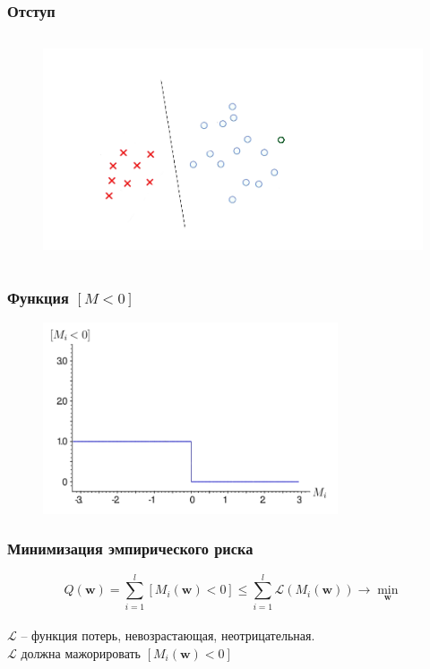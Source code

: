 \documentclass[10pt]{beamer}
\begin{document}
\begin{frame}\frametitle{Отступ}
	\begin{figure}[htbp]
	  \includegraphics[height=190pt, keepaspectratio = true]{images/margin2}
	\end{figure}
\end{frame}

\begin{frame}\frametitle{Функция $[M<0]$}
	\begin{figure}[htbp]
	  \includegraphics[height=160pt, keepaspectratio = true]{images/l1}
	\end{figure}
\end{frame}

\begin{frame}\frametitle{Минимизация эмпирического риска}
	$${Q(\mathbf{w}) = \sum\limits_{i=1}^l \left[ M_i(\mathbf{w}) < 0 \right] \leq \sum\limits_{i=1}^l \mathcal{L}(M_i(\mathbf{w})) \rightarrow \min\limits_{\mathbf{w}} }$$\\
	\bigbreak
	$\mathcal{L}$ -- функция потерь, невозрастающая, неотрицательная.\\
	$\mathcal{L}$ должна мажорировать $\left[M_i(\mathbf{w}) < 0 \right]$
\end{frame}
\end{document}
